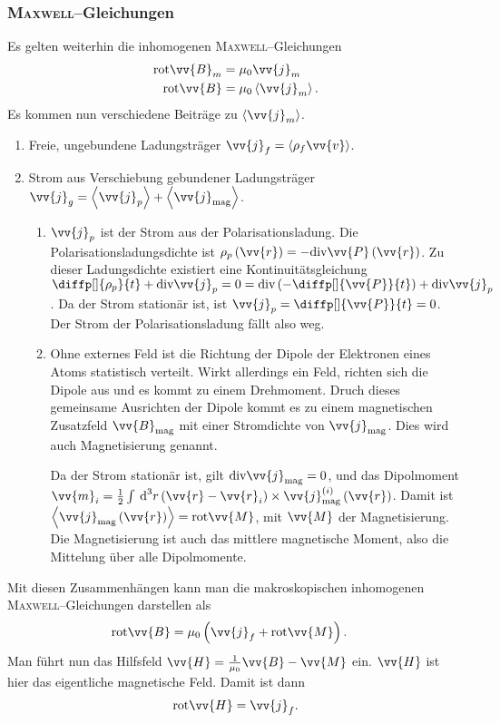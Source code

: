 \documentclass[a4paper,12pt]{article}
\newcommand{\td}{\,\text{d}}
\numberwithin{equation}{section}
\begin{document}
\subsubsection{\textsc{Maxwell}--Gleichungen}
Es gelten weiterhin die inhomogenen \textsc{Maxwell}--Gleichungen
\begin{align} 
        \text{rot}\vv{B}_m&=\mu _0\vv{j}_m\\
        \text{rot}\vv{B}&=\mu _0\left\langle \vv{j}_m\right\rangle 
.\end{align} 
Es kommen nun verschiedene Beiträge zu $\left\langle \vv{j}_m\right\rangle $.
\begin{enumerate}[label=\roman*)]
        \item Freie, ungebundene Ladungsträger $\vv{j}_f=\left\langle \rho _f\vv{v}\right\rangle $. 
        \item Strom aus Verschiebung gebundener Ladungsträger $\vv{j}_g=\left\langle \vv{j}_p\right\rangle +\left\langle \vv{j}_{\text{mag}}\right\rangle $. 
                \begin{enumerate}[label=\arabic*)]
                        \item $\vv{j}_p$ ist der Strom aus der Polarisationsladung. Die Polarisationsladungsdichte ist $\rho _p\left(\vv{r}\right)=-\text{div}\vv{P}\left(\vv{r}\right)$. Zu dieser Ladungsdichte existiert eine Kontinuitätsgleichung $\diffp[]{\rho _p}{t}+\text{div}\vv{j}_p=0=\text{div}\left(-\diffp[]{\vv{P}}{t}\right)+\text{div}\vv{j}_p$. Da der Strom stationär ist, ist $\vv{j}_p=\diffp[]{\vv{P}}{t}=0$. Der Strom der Polarisationsladung fällt also weg.
                        \item Ohne externes Feld ist die Richtung der Dipole der Elektronen eines Atoms statistisch verteilt. Wirkt allerdings ein Feld, richten sich die Dipole aus und es kommt zu einem Drehmoment. Druch dieses gemeinsame Ausrichten der Dipole kommt es zu einem magnetischen Zusatzfeld $\vv{B}_{\text{mag}}$ mit einer Stromdichte von $\vv{j}_{\text{mag}}$. Dies wird auch Magnetisierung genannt.\par
                                Da der Strom stationär ist, gilt $\text{div}\vv{j}_{\text{mag}}=0$, und das Dipolmoment $\vv{m}_i=\tfrac{1}{2}\int_{}^{}\td ^3r\left(\vv{r}-\vv{r}_i\right)\times \vv{j}_{\text{mag}}^{(i)}\left(\vv{r}\right)$. Damit ist $\left\langle \vv{j}_{\text{mag}}\left(\vv{r}\right)\right\rangle =\text{rot}\vv{M}$, mit $\vv{M}$ der Magnetisierung. Die Magnetisierung ist auch das mittlere magnetische Moment, also die Mittelung über alle Dipolmomente.
                \end{enumerate}
\end{enumerate}
Mit diesen Zusammenhängen kann man die makroskopischen inhomogenen \textsc{Maxwell}--Gleichungen darstellen als
\begin{align} 
        \text{rot}\vv{B}&=\mu _0\left(\vv{j}_f+\text{rot}\vv{M}\right)
.\end{align} 
Man führt nun das Hilfsfeld $\vv{H}=\tfrac{1}{\mu _0}\vv{B}-\vv{M}$ ein. $\vv{H}$ ist hier das eigentliche magnetische Feld. Damit ist dann
\begin{align} 
        \text{rot}\vv{H}=\vv{j}_f
.\end{align} 
\end{document}
